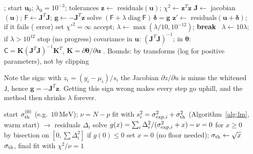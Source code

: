 \documentclass[11pt,a4paper]{article}
\numberwithin{equation}{section}
\theoremstyle{definition}
\theoremstyle{plain}
\theoremstyle{remark}
\numberwithin{algorithm}{section}
\newcommand{\diag}{\operatorname{diag}}
\newcommand{\MeV}{\,\mathrm{MeV}}
\newcommand{\sJ}{\mathsf J}
\newcommand{\sW}{\mathsf W}
\newcommand{\sF}{\mathsf F}
\newcommand{\sC}{\mathsf C}
\newcommand{\vth}{\bm\theta}
\newcommand{\vD}{\bm\Delta}
\begin{document}
\begin{algorithm}[H]
\caption{Levenberg--Marquardt on whitened residuals}\label{alg:lm}
\begin{algorithmic}[1]
\Require {}; start $\bm u_0$; $\lambda_0=10^{-3}$; tolerances
\State $\bm z\gets$ residuals$(\bm u)$; $\chi^2\gets\bm z^T\bm z$
\Repeat
  \State $\mathbf J\gets$ jacobian$(\bm u)$; $\sF\gets\mathbf J^T\mathbf J$; $\bm g\gets-\mathbf J^T\bm z$ \Comment{$\mathbf J=\partial\bm z/\partial\bm u$, so $\bm g=\sJ^T\sW\vD$}
  \Loop
    \State solve $(\sF+\lambda\diag\sF)\,\bm\delta=\bm g$ 
    \State $\bm z'\gets$ residuals$(\bm u+\bm\delta)$; if it fails ( error) set $\chi'^2=\infty$
     accept; $\lambda\gets\max(\lambda/10,10^{-12})$; \textbf{break}
    \Else\ $\lambda\gets10\lambda$; if $\lambda>10^{12}$ stop (no progress) \EndIf
  \EndLoop
{}
\State covariance in $\bm u$: $(\mathbf J^T\mathbf J)^{-1}$; in $\vth$: $\sC=\mathbf K(\mathbf J^T\mathbf J)^{-1}\mathbf K^T$, $\mathbf K=\partial\vth/\partial\bm u$
\Ensure {}. Bounds: by transforms (log for positive parameters), not by clipping
\end{algorithmic}
\end{algorithm}
Note the sign: with $z_i=(y_i-\mu_i)/s_i$ the Jacobian $\partial z/\partial u$ is minus the whitened $\sJ$, hence $\bm g=-\mathbf J^T\bm z$. Getting this sign wrong makes every step go uphill, and the method then shrinks $\lambda$ forever.

\begin{algorithm}[H]
\caption{Theory floor (common to all states)}\label{alg:floor}
\begin{algorithmic}[1]
\Require start $\sigma_{\rm th}^{(0)}$ (e.g.\ $10\MeV$); $\nu=N-p$
\Repeat
  \State fit with $s_i^2=\sigma_{{\rm exp},i}^2+\sigma_{\rm th}^2$ (Algorithm~\ref{alg:lm}, warm start) $\to$ residuals $\Delta_i$
  \State solve $g(x)=\sum_i\Delta_i^2/(\sigma_{{\rm exp},i}^2+x)-\nu=0$ for $x\ge0$ by bisection on $[0,\sum\Delta_i^2]$ 
  \State if $g(0)\le0$ set $x=0$ (no floor needed); $\sigma_{\rm th}\gets\sqrt x$
\Until{$|\Delta\sigma_{\rm th}|<10^{-4}\MeV$} 
\Ensure $\sigma_{\rm th}$, final fit with $\chi^2/\nu=1$
\end{algorithmic}
\end{algorithm}
\end{document}
